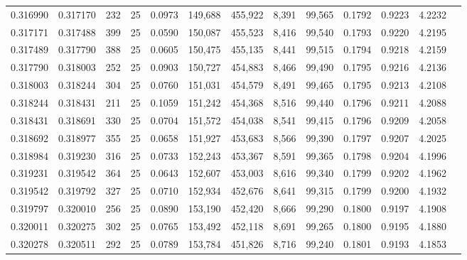 \begin{tabular}{rrrrrrrrrrrrr}
0.316990 & 0.317170 &   232 &  25 &                                     0.0973 & 149,688 & 455,922 &   8,391 &  99,565 & 0.1792 & 0.9223 & 4.2232 \\
0.317171 & 0.317488 &   399 &  25 &                                     0.0590 & 150,087 & 455,523 &   8,416 &  99,540 & 0.1793 & 0.9220 & 4.2195 \\
0.317489 & 0.317790 &   388 &  25 &                                     0.0605 & 150,475 & 455,135 &   8,441 &  99,515 & 0.1794 & 0.9218 & 4.2159 \\
0.317790 & 0.318003 &   252 &  25 &                                     0.0903 & 150,727 & 454,883 &   8,466 &  99,490 & 0.1795 & 0.9216 & 4.2136 \\
0.318003 & 0.318244 &   304 &  25 &                                     0.0760 & 151,031 & 454,579 &   8,491 &  99,465 & 0.1795 & 0.9213 & 4.2108 \\
0.318244 & 0.318431 &   211 &  25 &                                     0.1059 & 151,242 & 454,368 &   8,516 &  99,440 & 0.1796 & 0.9211 & 4.2088 \\
0.318431 & 0.318691 &   330 &  25 &                                     0.0704 & 151,572 & 454,038 &   8,541 &  99,415 & 0.1796 & 0.9209 & 4.2058 \\
0.318692 & 0.318977 &   355 &  25 &                                     0.0658 & 151,927 & 453,683 &   8,566 &  99,390 & 0.1797 & 0.9207 & 4.2025 \\
0.318984 & 0.319230 &   316 &  25 &                                     0.0733 & 152,243 & 453,367 &   8,591 &  99,365 & 0.1798 & 0.9204 & 4.1996 \\
0.319231 & 0.319542 &   364 &  25 &                                     0.0643 & 152,607 & 453,003 &   8,616 &  99,340 & 0.1799 & 0.9202 & 4.1962 \\
0.319542 & 0.319792 &   327 &  25 &                                     0.0710 & 152,934 & 452,676 &   8,641 &  99,315 & 0.1799 & 0.9200 & 4.1932 \\
0.319797 & 0.320010 &   256 &  25 &                                     0.0890 & 153,190 & 452,420 &   8,666 &  99,290 & 0.1800 & 0.9197 & 4.1908 \\
0.320011 & 0.320275 &   302 &  25 &                                     0.0765 & 153,492 & 452,118 &   8,691 &  99,265 & 0.1800 & 0.9195 & 4.1880 \\
0.320278 & 0.320511 &   292 &  25 &                                     0.0789 & 153,784 & 451,826 &   8,716 &  99,240 & 0.1801 & 0.9193 & 4.1853 \\

\end{tabular}
